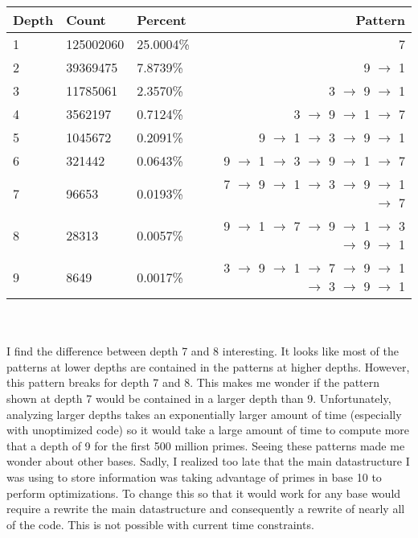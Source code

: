 \documentclass[13pt]{article}
\begin{document}
\begin{tabular} { l l l r }
Depth & Count      & Percent   & Pattern\\
\hline
    1 &  125002060 &  25.0004\% & 7\\
    2 &   39369475 &   7.8739\% & 9 $\rightarrow$ 1\\
    3 &   11785061 &   2.3570\% & 3 $\rightarrow$ 9 $\rightarrow$ 1\\
    4 &    3562197 &   0.7124\% & 3 $\rightarrow$ 9 $\rightarrow$ 1 $\rightarrow$ 7\\
    5 &    1045672 &   0.2091\% & 9 $\rightarrow$ 1 $\rightarrow$ 3 $\rightarrow$ 9 $\rightarrow$ 1\\
    6 &     321442 &   0.0643\% & 9 $\rightarrow$ 1 $\rightarrow$ 3 $\rightarrow$ 9 $\rightarrow$ 1 $\rightarrow$ 7\\
    7 &      96653 &   0.0193\% & 7 $\rightarrow$ 9 $\rightarrow$ 1 $\rightarrow$ 3 $\rightarrow$ 9 $\rightarrow$ 1 $\rightarrow$ 7\\
    8 &      28313 &   0.0057\% & 9 $\rightarrow$ 1 $\rightarrow$ 7 $\rightarrow$ 9 $\rightarrow$ 1 $\rightarrow$ 3 $\rightarrow$ 9 $\rightarrow$ 1\\
    9 &       8649 &   0.0017\% & 3 $\rightarrow$ 9 $\rightarrow$ 1 $\rightarrow$ 7 $\rightarrow$ 9 $\rightarrow$ 1 $\rightarrow$ 3 $\rightarrow$ 9 $\rightarrow$ 1\\
\end{tabular}\\\\
I find the difference between depth 7 and 8 interesting. It looks like most of the patterns at lower depths are contained in the patterns at higher depths. However, this pattern breaks for depth 7 and 8. This makes me wonder if the pattern shown at depth 7 would be contained in a larger depth than 9. Unfortunately, analyzing larger depths takes an exponentially larger amount of time (especially with unoptimized code) so it would take a large amount of time to compute more that a depth of 9 for the first 500 million primes. Seeing these patterns made me wonder about other bases. Sadly, I realized too late that the main datastructure I was using to store information was taking advantage of primes in base 10 to perform optimizations. To change this so that it would work for any base would require a rewrite the main datastructure and consequently a rewrite of nearly all of the code. This is not possible with current time constraints. \\\\
\end{document}

